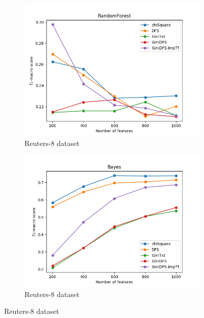 \documentclass[a4paper, 14pt]{article}
\begin{document}
\begin{justify}
\begin{justify}
\begin{figure}[h!]
\centering
\begin{subfigure}{.5\textwidth}
  \centering
  \includegraphics[width=1.1\linewidth]{pf1_macro_r8_rf.png}
  \caption{Reuters-8 dataset}
  \label{fig:sub1}
\end{subfigure}%
\begin{subfigure}{.5\textwidth}
  \includegraphics[width=1.1\linewidth]{pf1_macro_r8_bayes.png}
  \caption{Reuters-8 dataset}
  \label{fig:sub2}
\end{subfigure}
\label{fig:test}
\end{figure}



\end{justify}
\end{justify}
\end{document}
